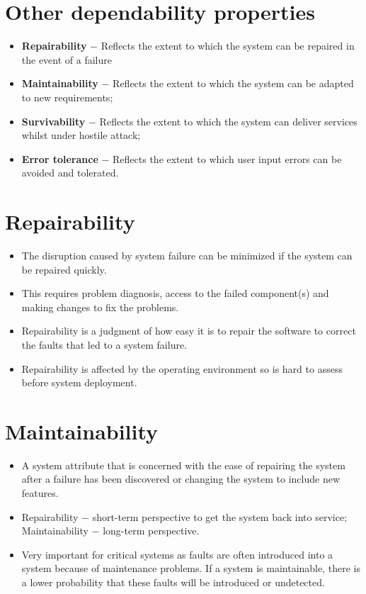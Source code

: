  \section{Other dependability properties}
\begin{itemize}
\item \textbf{Repairability}
$-$ Reflects the extent to which the system can be repaired in the event of a failure

\item \textbf{Maintainability}
$-$ Reflects the extent to which the system can be adapted to new requirements;

\item \textbf{Survivability}
$-$ Reflects the extent to which the system can deliver services whilst under hostile attack;

\item \textbf{Error tolerance}
$-$ Reflects the extent to which user input errors can be avoided and tolerated.

\end{itemize}

\section{Repairability}
\begin{itemize}
\item The disruption caused by system failure can be minimized if the system can be repaired quickly.
\item This requires problem diagnosis, access to the failed component(s) and making changes to fix the problems.
\item Repairability is a judgment of how easy it is to repair the software to correct the faults that led to a system failure.
\item Repairability is affected by the operating environment so is hard to assess before system deployment.
\end{itemize}

\section{Maintainability}
\begin{itemize}
\item A system attribute that is concerned with the ease of repairing the system after a failure has been discovered or changing the system to include new features.
\item Repairability $-$ short-term perspective to get the system back into service; Maintainability $-$ long-term perspective.
\item Very important for critical systems as faults are often introduced into a system because of maintenance problems. If a system is maintainable, there is a lower probability that these faults will be introduced or undetected.
\end{itemize}
